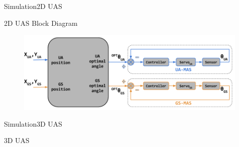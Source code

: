 \begin{frame}{Simulation}{2D UAS}
	\begin{block}{2D UAS Block Diagram}

		\begin{figure}
	        \includegraphics[scale=0.28]{figures/2D_system.png}
	    \end{figure}
    \end{block}
\end{frame}

\begin{frame}{Simulation}{3D UAS}

  \begin{block}{3D UAS}

  \end{block}

\end{frame}